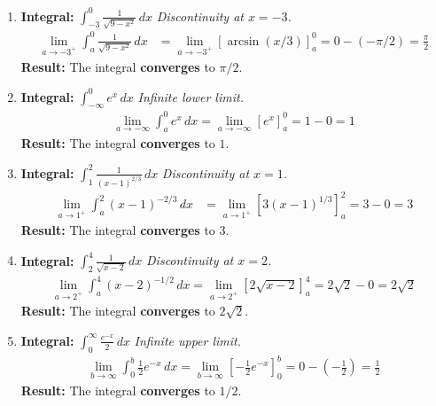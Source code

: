 \documentclass[12pt]{article}
\begin{document}
\begin{enumerate}
    \item \textbf{Integral: } $\displaystyle \int_{-3}^{0} \frac{1}{\sqrt{9-x^2}} \,dx$
    \textit{Discontinuity at $x=-3$.}
    \begin{align*}
        \lim_{a \to -3^+} \int_{a}^{0} \frac{1}{\sqrt{9-x^2}} \,dx &= \lim_{a \to -3^+} [\arcsin(x/3)]_a^0 = 0 - (-\pi/2) = \frac{\pi}{2}
    \end{align*}
    \textbf{Result:} The integral \textbf{converges} to $\pi/2$.

    \item \textbf{Integral: } $\displaystyle \int_{-\infty}^{0} e^x \,dx$
    \textit{Infinite lower limit.}
    \begin{align*}
        \lim_{a \to -\infty} \int_{a}^{0} e^x \,dx = \lim_{a \to -\infty} [e^x]_a^0 = 1 - 0 = 1
    \end{align*}
    \textbf{Result:} The integral \textbf{converges} to $1$.

    \item \textbf{Integral: } $\displaystyle \int_{1}^{2} \frac{1}{(x-1)^{2/3}} \,dx$
    \textit{Discontinuity at $x=1$.}
    \begin{align*}
        \lim_{a \to 1^+} \int_{a}^{2} (x-1)^{-2/3} \,dx &= \lim_{a \to 1^+} [3(x-1)^{1/3}]_a^2 = 3 - 0 = 3
    \end{align*}
    \textbf{Result:} The integral \textbf{converges} to $3$.

    \item \textbf{Integral: } $\displaystyle \int_{2}^{4} \frac{1}{\sqrt{x-2}} \,dx$
    \textit{Discontinuity at $x=2$.}
    \begin{align*}
        \lim_{a \to 2^+} \int_{a}^{4} (x-2)^{-1/2} \,dx = \lim_{a \to 2^+} [2\sqrt{x-2}]_a^4 = 2\sqrt{2} - 0 = 2\sqrt{2}
    \end{align*}
    \textbf{Result:} The integral \textbf{converges} to $2\sqrt{2}$.

    \item \textbf{Integral: } $\displaystyle \int_{0}^{\infty} \frac{e^{-x}}{2} \,dx$
    \textit{Infinite upper limit.}
    \begin{align*}
        \lim_{b \to \infty} \int_{0}^{b} \frac{1}{2}e^{-x} \,dx = \lim_{b \to \infty} [-\frac{1}{2}e^{-x}]_0^b = 0 - (-\frac{1}{2}) = \frac{1}{2}
    \end{align*}
    \textbf{Result:} The integral \textbf{converges} to $1/2$.
\end{enumerate}
\end{document}
